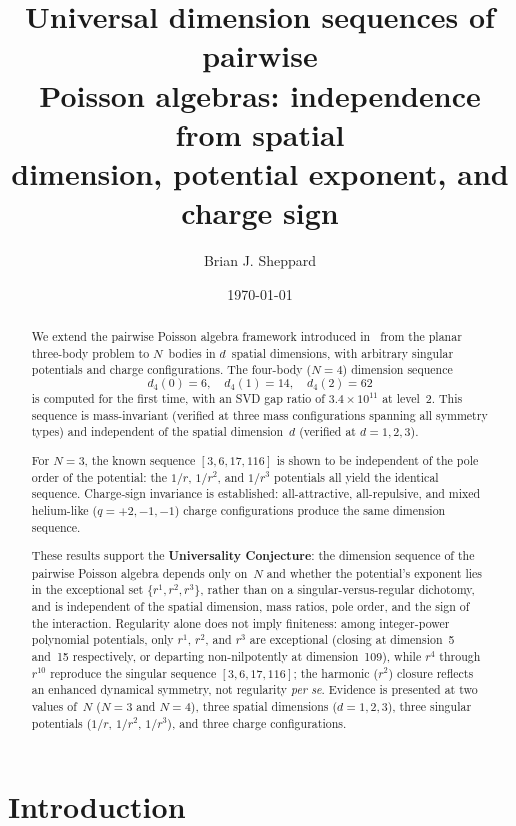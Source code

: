 \documentclass[11pt,a4paper]{article}
\title{Universal dimension sequences of pairwise\\
Poisson algebras: independence from spatial\\
dimension, potential exponent, and charge sign}
\author{Brian J. Sheppard}
\date{\today}
\theoremstyle{remark}
\begin{document}
\maketitle

\begin{abstract}
We extend the pairwise Poisson algebra framework
introduced in~\cite{paper1} from the planar three-body
problem to $N$~bodies in $d$~spatial dimensions, with
arbitrary singular potentials and charge configurations.
The four-body ($N{=}4$) dimension sequence
\[
  d_4(0) = 6, \quad d_4(1) = 14, \quad d_4(2) = 62
\]
is computed for the first time, with an SVD gap ratio of
$3.4 \times 10^{11}$ at level~2.  This sequence is
mass-invariant (verified at three mass configurations
spanning all symmetry types) and independent of the
spatial dimension~$d$ (verified at $d = 1, 2, 3$).

For $N{=}3$, the known sequence $[3, 6, 17, 116]$ is
shown to be independent of the pole order of the
potential: the $1/r$, $1/r^2$, and $1/r^3$ potentials
all yield the identical sequence.  Charge-sign invariance
is established: all-attractive, all-repulsive, and mixed
helium-like ($q = {+}2, {-}1, {-}1$) charge
configurations produce the same dimension sequence.

These results support the \textbf{Universality
Conjecture}: the dimension sequence of the pairwise
Poisson algebra depends only on~$N$ and whether the
potential's exponent lies in the exceptional set
$\{r^1, r^2, r^3\}$, rather than on a singular-versus-regular
dichotomy, and is independent of the spatial dimension, mass ratios,
pole order, and the sign of the interaction.  Regularity
alone does not imply finiteness: among integer-power
polynomial potentials, only $r^1$, $r^2$, and $r^3$ are
exceptional (closing at dimension~5 and~15 respectively,
or departing non-nilpotently at dimension~109), while
$r^4$ through $r^{10}$ reproduce the singular sequence
$[3, 6, 17, 116]$; the harmonic ($r^2$) closure reflects
an enhanced dynamical symmetry, not regularity \emph{per
se}.  Evidence is presented at two values
of~$N$ ($N{=}3$ and $N{=}4$), three spatial dimensions
($d{=}1,2,3$), three singular potentials ($1/r$,
$1/r^2$, $1/r^3$), and three charge configurations.
\end{abstract}


\section{Introduction}
\end{document}
